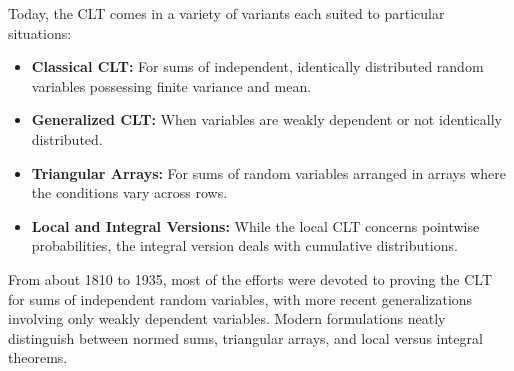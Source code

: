Today, the CLT comes in a variety of variants each suited to particular situations:
\begin{itemize}
    \item \textbf{Classical CLT:} For sums of independent, identically distributed random variables possessing finite variance and mean.
    \item \textbf{Generalized CLT:} When variables are weakly dependent or not identically distributed.
    \item \textbf{Triangular Arrays:} For sums of random variables arranged in arrays where the conditions vary across rows.
    \item \textbf{Local and Integral Versions:} While the local CLT concerns pointwise probabilities, the integral version deals with cumulative distributions.
\end{itemize}
From about 1810 to 1935, most of the efforts were devoted to proving the CLT for sums of independent random variables, with more recent generalizations involving only weakly dependent variables. Modern formulations neatly distinguish between normed sums, triangular arrays, and local versus integral theorems.
